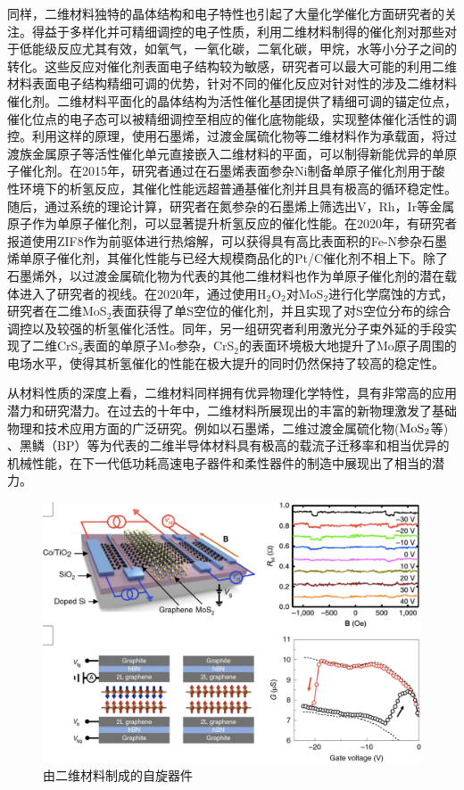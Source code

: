     同样，二维材料独特的晶体结构和电子特性也引起了大量化学催化方面研究者的关注。得益于多样化并可精细调控的电子性质，利用二维材料制得的催化剂对那些对于低能级反应尤其有效，如氧气，一氧化碳，二氧化碳，甲烷，水等小分子之间的转化。这些反应对催化剂表面电子结构较为敏感，研究者可以最大可能的利用二维材料表面电子结构精细可调的优势，针对不同的催化反应对针对性的涉及二维材料催化剂。二维材料平面化的晶体结构为活性催化基团提供了精细可调的锚定位点，催化位点的电子态可以被精细调控至相应的催化底物能级，实现整体催化活性的调控。利用这样的原理，使用石墨烯，过渡金属硫化物等二维材料作为承载面，将过渡族金属原子等活性催化单元直接嵌入二维材料的平面，可以制得新能优异的单原子催化剂。在2015年，研究者通过在石墨烯表面参杂Ni制备单原子催化剂用于酸性环境下的析氢反应，其催化性能远超普通基催化剂并且具有极高的循环稳定性。随后，通过系统的理论计算，研究者在氮参杂的石墨烯上筛选出V，Rh，Ir等金属原子作为单原子催化剂，可以显著提升析氢反应的催化性能。在2020年，有研究者报道使用ZIF8作为前驱体进行热熔解，可以获得具有高比表面积的Fe-N参杂石墨烯单原子催化剂，其催化性能与已经大规模商品化的Pt/C催化剂不相上下。除了石墨烯外，以过渡金属硫化物为代表的其他二维材料也作为单原子催化剂的潜在载体进入了研究者的视线。在2020年，通过使用H$_2$O$_2$对MoS$_2$进行化学腐蚀的方式，研究者在二维MoS$_2$表面获得了单S空位的催化剂，并且实现了对S空位分布的综合调控以及较强的析氢催化活性。同年，另一组研究者利用激光分子束外延的手段实现了二维CrS$_2$表面的单原子Mo参杂，CrS$_2$的表面环境极大地提升了Mo原子周围的电场水平，使得其析氢催化的性能在极大提升的同时仍然保持了较高的稳定性。

    从材料性质的深度上看，二维材料同样拥有优异物理化学特性，具有非常高的应用潜力和研究潜力。在过去的十年中，二维材料所展现出的丰富的新物理激发了基础物理和技术应用方面的广泛研究。例如以石墨烯，二维过渡金属硫化物($\rm{MoS_{2}}$等) 、黑鳞（BP）等为代表的二维半导体材料具有极高的载流子迁移率和相当优异的机械性能，在下一代低功耗高速电子器件和柔性器件的制造中展现出了相当的潜力。
    
    \begin{figure}[htb]
        \includegraphics{pic/INTRO_SPIN.png}
        \caption{由二维材料制成的自旋器件}
    \end{figure}

